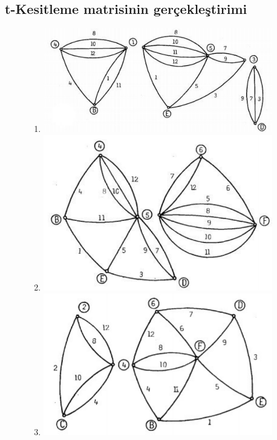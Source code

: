\documentclass[11pt]{amsbook}
\begin{document}

\subsection{t-Kesitleme matrisinin gerçekleştirimi}
    \begin{figure}[h]
    	    \begin{enumerate}[label=(\alph*)]
        	    \item    
                	\includegraphics[width=10cm]{images/ceyhun-168-fig01}
            	\item
            	    \includegraphics[width=10cm]{images/ceyhun-168-fig02}
        	    \item
            	    \includegraphics[width=10cm]{images/ceyhun-168-fig03}
            \end{enumerate}
        \label{fig:fig1}
    \end{figure}
\end{document}
